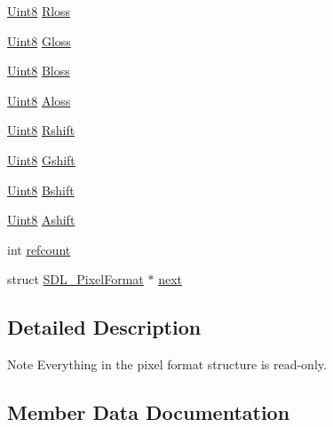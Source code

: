 \begin{DoxyCompactItemize}
\hyperlink{_s_d_l__stdinc_8h_a2944638813a090aa23e62f4da842c3e2}{Uint8} \hyperlink{struct_s_d_l___pixel_format_a9994b4ed87a2551253aebfa191db8424}{Rloss}
\item 
\hyperlink{_s_d_l__stdinc_8h_a2944638813a090aa23e62f4da842c3e2}{Uint8} \hyperlink{struct_s_d_l___pixel_format_a94469768d8436e631a13d68623ff663f}{Gloss}
\item 
\hyperlink{_s_d_l__stdinc_8h_a2944638813a090aa23e62f4da842c3e2}{Uint8} \hyperlink{struct_s_d_l___pixel_format_a337072c1bc8b41efdd2da4e95b8c2ff7}{Bloss}
\item 
\hyperlink{_s_d_l__stdinc_8h_a2944638813a090aa23e62f4da842c3e2}{Uint8} \hyperlink{struct_s_d_l___pixel_format_a660e95097874088292f1289a458efaa2}{Aloss}
\item 
\hyperlink{_s_d_l__stdinc_8h_a2944638813a090aa23e62f4da842c3e2}{Uint8} \hyperlink{struct_s_d_l___pixel_format_abfdec7b9ee2ee39db630f4022e4e0daa}{Rshift}
\item 
\hyperlink{_s_d_l__stdinc_8h_a2944638813a090aa23e62f4da842c3e2}{Uint8} \hyperlink{struct_s_d_l___pixel_format_a6045012f994c02a86bdc4a91b28d2a3c}{Gshift}
\item 
\hyperlink{_s_d_l__stdinc_8h_a2944638813a090aa23e62f4da842c3e2}{Uint8} \hyperlink{struct_s_d_l___pixel_format_a4212574b67529628d8822ed4eb109754}{Bshift}
\item 
\hyperlink{_s_d_l__stdinc_8h_a2944638813a090aa23e62f4da842c3e2}{Uint8} \hyperlink{struct_s_d_l___pixel_format_ac3c4ffa0de1f2c94040340deede3bf46}{Ashift}
\item 
int \hyperlink{struct_s_d_l___pixel_format_a23be8060443d58064a720a4e2ef31729}{refcount}
\item 
struct \hyperlink{struct_s_d_l___pixel_format}{S\+D\+L\+\_\+\+Pixel\+Format} $\ast$ \hyperlink{struct_s_d_l___pixel_format_a1953b66c817116bf81bae4873ee6bce5}{next}
\end{DoxyCompactItemize}


\subsection{Detailed Description}
\begin{DoxyNote}{Note}
Everything in the pixel format structure is read-\/only. 
\end{DoxyNote}


\subsection{Member Data Documentation}
\mbox{\label{struct_s_d_l___pixel_format_a660e95097874088292f1289a458efaa2}} 
